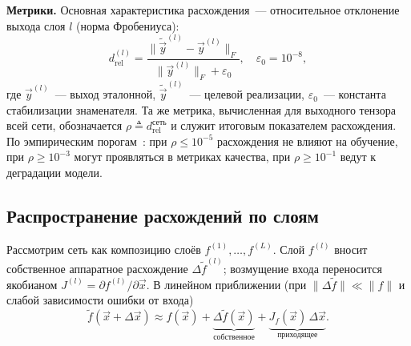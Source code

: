 \textbf{Метрики.} Основная характеристика расхождения~--- относительное
отклонение выхода слоя $l$ (норма Фробениуса):
\begin{equation}
    \label{eq:drel}
    d_{\text{rel}}^{(l)} =
    \frac{\bigl\|\tilde{\Vec{y}}^{(l)} - \Vec{y}^{(l)}\bigr\|_F}
    {\bigl\|\Vec{y}^{(l)}\bigr\|_F + \varepsilon_0},
    \quad \varepsilon_0 = 10^{-8},
\end{equation}
где $\Vec{y}^{(l)}$~--- выход эталонной, $\tilde{\Vec{y}}^{(l)}$~--- целевой
реализации, $\varepsilon_0$~--- константа стабилизации знаменателя. Та же метрика,
вычисленная для выходного тензора всей сети, обозначается
$\rho\triangleq d_{\text{rel}}^{\text{сеть}}$ и служит итоговым показателем
расхождения. По эмпирическим порогам~\cite{Micikevicius2018}: при
$\rho\le10^{-5}$ расхождения не влияют на обучение, при $\rho\ge10^{-3}$ могут
проявляться в метриках качества, при $\rho\ge10^{-1}$ ведут к деградации модели.

\subsection{Распространение расхождений по слоям}

Рассмотрим сеть как композицию слоёв $f^{(1)},\dots,f^{(L)}$. Слой $f^{(l)}$
вносит собственное аппаратное расхождение $\Delta\tilde f^{(l)}$; возмущение
входа переносится якобианом $J^{(l)}=\partial f^{(l)}/\partial\Vec{x}$. В
линейном приближении (при $\|\Delta\tilde f\|\ll\|f\|$ и слабой зависимости
ошибки от входа)
\begin{equation*}
    \tilde f(\Vec{x} + \Delta\Vec{x}) \approx
    f(\Vec{x}) + \underbrace{\Delta\tilde f(\Vec{x})}_{\text{собственное}}
    + \underbrace{J_f(\Vec{x})\,\Delta\Vec{x}}_{\text{приходящее}}.
\end{equation*}

